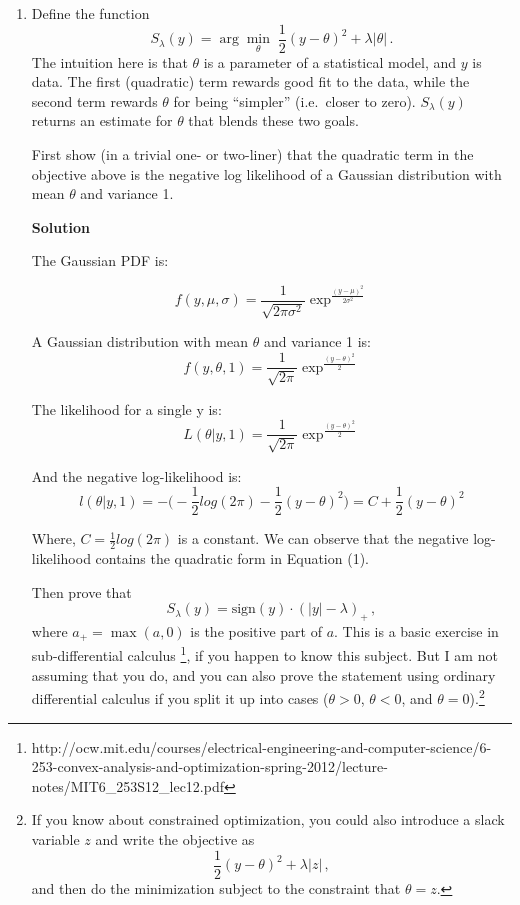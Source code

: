 \documentclass[11 pt]{article}
\begin{document}
\begin{enumerate}[label=(\Alph*)]
\item Define the function
\begin{equation}
\label{eqn:soft_thresholding}
S_\lambda(y) = \arg \min_{\theta} \; \frac{1}{2}(y - \theta)^2 + \lambda | \theta | \, .
\end{equation}
The intuition here is that $\theta$ is a parameter of a statistical model, and $y$ is data.   The first (quadratic) term rewards good fit to the data, while the second term rewards $\theta$ for being ``simpler'' (i.e.~closer to zero).  $S_\lambda(y)$ returns an estimate for $\theta$ that blends these two goals.

First show (in a trivial one- or two-liner) that the quadratic term in the objective above is the negative log likelihood of a Gaussian distribution with mean $\theta$ and variance 1.  

\vspace{2mm}
\textbf{Solution}

The Gaussian PDF is:

$$ f(y,\mu, \sigma) = \frac{1}{\sqrt{2 \pi \sigma^2}} \exp ^ {\frac{(y - \mu)^2}{2 \sigma^2}}$$

A Gaussian distribution with mean $\theta$ and variance 1 is:
$$ f(y,\theta, 1) = \frac{1}{\sqrt{2 \pi}} \exp ^ {\frac{(y - \theta)^2}{2}}$$

The likelihood for a single y is: 
$$ L(\theta| y,1) =   \frac{1}{\sqrt{2 \pi}} \exp ^ {\frac{(y - \theta)^2}{2}}$$

And the negative log-likelihood is: 
$$ l(\theta| y,1) =  - \bigg(-\frac{1}{2}log(2 \pi) - \frac{1}{2}(y - \theta)^2 \bigg) = C + \frac{1}{2}(y - \theta)^2$$

Where, $C= \frac{1}{2}log(2 \pi)$ is a constant. We can observe that the negative log-likelihood contains the quadratic form in Equation (1).  

\vspace{10mm}

Then prove that 
$$
S_\lambda(y) = \mbox{sign}(y) \cdot (|y| - \lambda)_+ \, ,
$$
where $a_+ = \max(a,0)$ is the positive part of $a$.  This is a basic exercise in sub-differential calculus
\footnote{http://ocw.mit.edu/courses/electrical-engineering-and-computer-science/6-253-convex-analysis-and-optimization-spring-2012/lecture-notes/MIT6\_253S12\_lec12.pdf},
 if you happen to know this subject.  But I am not assuming that you do, and you can also prove the statement using ordinary differential calculus if you split it up into cases ($\theta>0$, $\theta<0$, and $\theta=0$).\footnote{If you know about constrained optimization, you could also introduce a slack variable $z$ and write the objective as
	$$
	\frac{1}{2}(y - \theta)^2 + \lambda | z | \, ,
	$$
	and then do the minimization subject to the constraint that $\theta = z$.}  


\end{enumerate}
\end{document}
